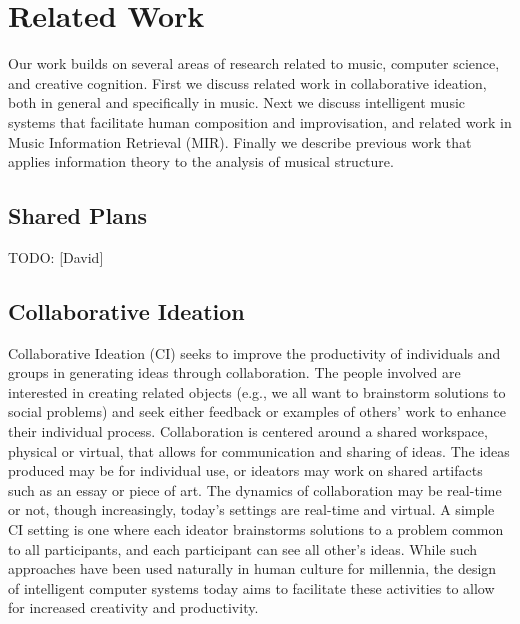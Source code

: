 \documentclass[final,authoryear,11pt,times]{elsarticle}
\begin{document}
\section{Related Work}

Our work builds on several areas of research related to music, computer science, and creative cognition. First we discuss related work in collaborative ideation, both in general and specifically in music. Next we discuss intelligent 
music systems that facilitate human composition and improvisation, and related work in Music Information Retrieval (MIR). Finally we describe previous work that applies information theory to the analysis of musical structure.

\subsection{Shared Plans}
TODO: [David]

\subsection{Collaborative Ideation}

Collaborative Ideation (CI) seeks to improve the productivity of individuals and groups in generating ideas through collaboration. The people involved are interested in creating related objects (e.g., we all want to brainstorm solutions to social problems) and seek either feedback or examples of others' work to enhance their individual process. Collaboration is centered around a shared workspace, physical or virtual, that allows for communication and sharing of ideas. The ideas produced may be for individual use, or ideators may work on shared artifacts such as an essay or piece of art. The dynamics of collaboration may be real-time or not, though increasingly, today's settings are real-time and virtual. A simple CI setting is one where each ideator brainstorms solutions to a problem common to all participants, and each participant can see all other's ideas. While such approaches have been used naturally in human culture for millennia, the design of intelligent computer systems today aims to facilitate these activities to allow for increased creativity and productivity. 
\end{document}
